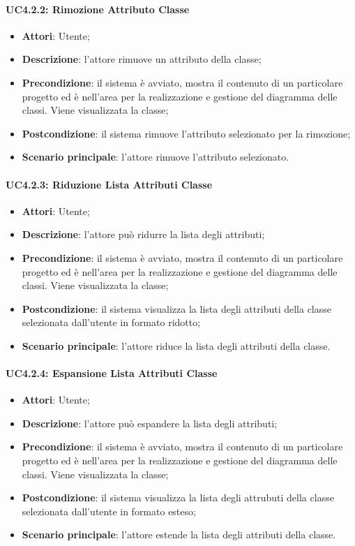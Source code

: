 \paragraph{UC4.2.2: Rimozione Attributo Classe}
\label{UC4.2.2}
\begin{itemize}
	\item \textbf{Attori}: Utente;
	\item \textbf{Descrizione}: l'attore rimuove un attributo della classe;
	\item \textbf{Precondizione}: il sistema è avviato, mostra il contenuto di un particolare progetto ed è nell'area per la realizzazione e gestione del diagramma delle classi. Viene visualizzata la classe;
	\item \textbf{Postcondizione}: il sistema rimuove l'attributo selezionato per la rimozione;
	\item \textbf{Scenario principale}: l'attore rimuove l'attributo selezionato.
\end{itemize}

\paragraph{UC4.2.3: Riduzione Lista Attributi Classe}
\label{UC4.2.3}
\begin{itemize}
	\item \textbf{Attori}: Utente;
	\item \textbf{Descrizione}: l'attore può ridurre la lista degli attributi;
	\item \textbf{Precondizione}: il sistema è avviato, mostra il contenuto di un particolare progetto ed è nell'area per la realizzazione e gestione del diagramma delle classi. Viene visualizzata la classe;
	\item \textbf{Postcondizione}: il sistema visualizza la lista degli attributi della classe selezionata dall'utente in formato ridotto;
	\item \textbf{Scenario principale}: l'attore riduce la lista degli attributi della classe.
\end{itemize}

\paragraph{UC4.2.4: Espansione Lista Attributi Classe}
\label{UC4.2.4}
\begin{itemize}
	\item \textbf{Attori}: Utente;
	\item \textbf{Descrizione}: l'attore può espandere la lista degli attributi;
	\item \textbf{Precondizione}: il sistema è avviato, mostra il contenuto di un particolare progetto ed è nell'area per la realizzazione e gestione del diagramma delle classi. Viene visualizzata la classe;
	\item \textbf{Postcondizione}: il sistema visualizza la lista degli attrubuti della classe selezionata dall'utente in formato esteso;
	\item \textbf{Scenario principale}: l'attore estende la lista degli attributi della classe.
\end{itemize}

